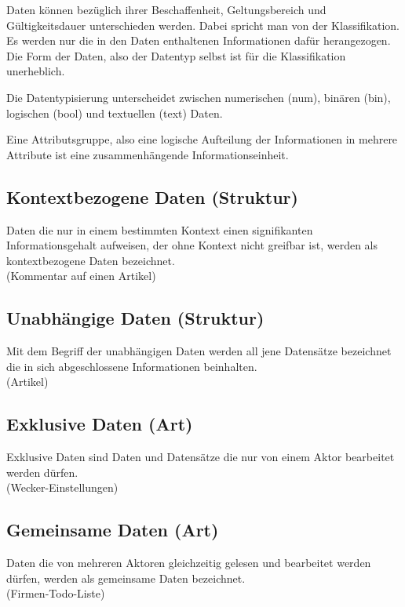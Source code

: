 \documentclass[oneside,11pt,parskip=half,ngerman]{scrreprt}
\begin{document}
Daten können bezüglich ihrer Beschaffenheit, Geltungsbereich und
Gültigkeitsdauer unterschieden werden. Dabei spricht man von der
Klassifikation. Es werden nur die in den Daten enthaltenen Informationen
dafür herangezogen. Die Form der Daten, also der Datentyp selbst ist für
die Klassifikation unerheblich.

Die Datentypisierung unterscheidet zwischen numerischen (num), binären
(bin), logischen (bool) und textuellen (text) Daten.

Eine Attributsgruppe, also eine logische Aufteilung der Informationen in
mehrere Attribute ist eine zusammenhängende Informationseinheit.

\subsection{Kontextbezogene Daten
(Struktur)}\label{kontextbezogene-daten-struktur}

Daten die nur in einem bestimmten Kontext einen signifikanten
Informationsgehalt aufweisen, der ohne Kontext nicht greifbar ist,
werden als kontextbezogene Daten bezeichnet.\\(Kommentar auf einen
Artikel)\\

\subsection{Unabhängige Daten
(Struktur)}\label{unabhuxe4ngige-daten-struktur}

Mit dem Begriff der unabhängigen Daten werden all jene Datensätze
bezeichnet die in sich abgeschlossene Informationen
beinhalten.\\(Artikel)

\subsection{Exklusive Daten (Art)}\label{exklusive-daten-art}

Exklusive Daten sind Daten und Datensätze die nur von einem Aktor
bearbeitet werden dürfen.\\(Wecker-Einstellungen)

\subsection{Gemeinsame Daten (Art)}\label{gemeinsame-daten-art}

Daten die von mehreren Aktoren gleichzeitig gelesen und bearbeitet
werden dürfen, werden als gemeinsame Daten
bezeichnet.\\(Firmen-Todo-Liste)
\end{document}
